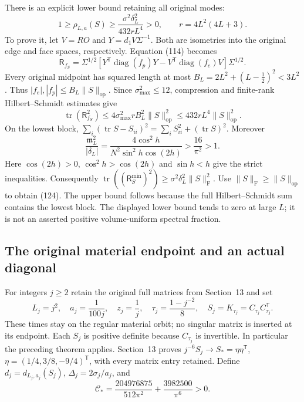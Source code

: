 \documentclass[11pt]{article}
\begin{document}
There is an explicit lower bound retaining all original modes:
\begin{equation}\label{eq:low-fraction-bound}
 1\ge\rho_{L,a}(S)\ge
 \frac{\sigma^2\delta_L^2}{432rL^4}>0,\qquad
 r=4L^2(4L+3).
\end{equation}
To prove it, let $V=RO$ and $Y=d_1V\Sigma^{-1}$. Both are
isometries into the original edge and face spaces, respectively.
Equation (114) becomes
\[
 \mathsf R_{f_S}=\Sigma^{1/2}
  [Y^{\mathsf T}\operatorname{diag}(f_p)Y
             -V^{\mathsf T}\operatorname{diag}(f_e)V]\Sigma^{1/2}.
\]
Every original midpoint has squared length at most
$B_L=2L^2+(L-\tfrac12)^2<3L^2$. Thus
$|f_e|,|f_p|\le B_L\|S\|_{\mathrm{op}}$.
Since $\sigma_{\max}^2\le12$, compression and finite-rank
Hilbert--Schmidt estimates give
\[
 \operatorname{tr}(\mathsf R_{f_S}^2)
 \le 4\sigma_{\max}^2rB_L^2\|S\|_{\mathrm{op}}^2
 \le432rL^4\|S\|_{\mathrm{op}}^2.
\]
On the lowest block,
$\sum_i(\operatorname{tr}S-S_{ii})^2
=\sum_iS_{ii}^2+(\operatorname{tr}S)^2$.
Moreover
\[
 \frac{\mathfrak m_L^2}{|\delta_L|}
 =\frac{4\cos^2h}{N^2\sin^2h\cos(2h)}
 >\frac{16}{\pi^2}>1.
\]
Here $\cos(2h)>0$, $\cos^2h>\cos(2h)$ and $\sin h<h$
give the strict inequalities. Consequently
$\operatorname{tr}((\mathsf R_S^{\min})^2)
\ge\sigma^2\delta_L^2\|S\|_{\mathrm F}^2$.
Use $\|S\|_{\mathrm F}\ge\|S\|_{\mathrm{op}}$ to obtain
(124). The upper bound follows because
the full Hilbert--Schmidt sum contains the lowest block.
The displayed lower bound tends to zero at large $L$; it is not
an asserted positive volume-uniform spectral fraction.

\subsection{The original material endpoint and an actual diagonal}

For integers $j\ge2$ retain the original full matrices from Section~13 and set
\begin{equation}\label{eq:low-diagonal}
 L_j=j^2,\quad a_j=\frac1{100j},\quad z_j=\frac1j,\quad
 \tau_j=\frac{1-j^{-2}}8,\quad S_j=K_{\tau_j}=C_{\tau_j}C_{\tau_j}^{\mathsf T}.
\end{equation}
These times stay on the regular material orbit; no singular matrix is
inserted at its endpoint. Each $S_j$ is positive definite because
$C_{\tau_j}$ is invertible. In particular the preceding theorem applies.
Section~13 proves $j^{-6}S_j\to S_*=\eta\eta^{\mathsf T}$,
$\eta=(1/4,3/8,-9/4)^{\mathsf T}$, with every matrix entry retained.
Define $d_j=d_{L_j,a_j}(S_j)$, $\Delta_j=2\sigma_j/a_j$, and
\begin{equation}\label{eq:low-constant}
 \mathcal C_*=
 \frac{204976875}{512\pi^2}+\frac{3982500}{\pi^6}>0 .
\end{equation}
\end{document}
